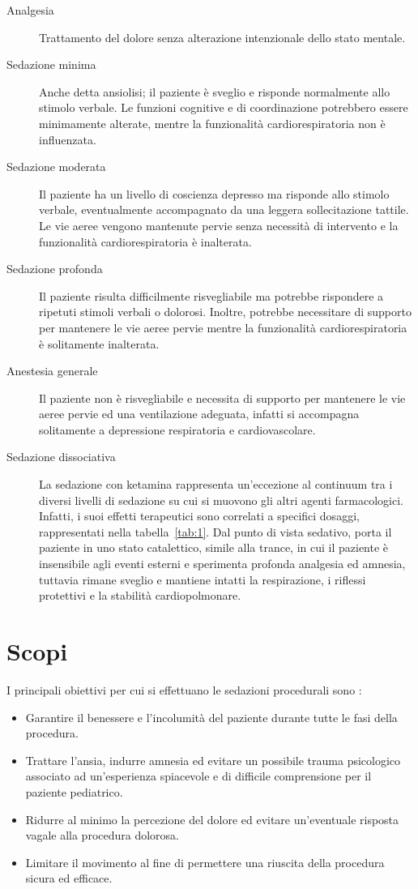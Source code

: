\begin{description}
\item[Analgesia] Trattamento del dolore senza alterazione intenzionale dello stato mentale.
\item[Sedazione minima] Anche detta ansiolisi; il paziente è sveglio e risponde normalmente allo stimolo verbale. Le funzioni cognitive e di coordinazione potrebbero essere minimamente alterate, mentre la funzionalità cardiorespiratoria non è influenzata.
\item[Sedazione moderata] Il paziente ha un livello di coscienza depresso ma risponde allo stimolo verbale, eventualmente accompagnato da una leggera sollecitazione tattile. Le vie aeree vengono mantenute pervie senza necessità di intervento e la funzionalità cardiorespiratoria è inalterata. 
\item[Sedazione profonda] Il paziente risulta difficilmente risvegliabile ma potrebbe rispondere a ripetuti stimoli verbali o dolorosi. Inoltre, potrebbe necessitare di supporto per mantenere le vie aeree pervie mentre la funzionalità cardiorespiratoria è solitamente inalterata. 
\item[Anestesia generale] Il paziente non è risvegliabile e necessita di supporto per mantenere le vie aeree pervie ed una ventilazione adeguata, infatti si accompagna solitamente a depressione respiratoria e cardiovascolare. 
\item[Sedazione dissociativa] La sedazione con ketamina rappresenta un'eccezione al continuum tra i diversi livelli di sedazione su cui si muovono gli altri agenti farmacologici. Infatti, i suoi effetti terapeutici sono correlati a specifici dosaggi, rappresentati nella tabella~\ref{tab:1}. Dal punto di vista sedativo, porta il paziente in uno stato catalettico, simile alla trance, in cui il paziente è insensibile agli eventi esterni e sperimenta profonda analgesia ed amnesia, tuttavia rimane sveglio e mantiene intatti la respirazione, i riflessi protettivi e la stabilità cardiopolmonare.

\end{description}

\section{Scopi}

I principali obiettivi per cui si effettuano le sedazioni procedurali sono \cite{Uptodatesed}: 

\begin{itemize}
    \item Garantire il benessere e l'incolumità del paziente durante tutte le fasi della procedura.
    \item Trattare l'ansia, indurre amnesia ed evitare un possibile trauma psicologico associato ad un'esperienza spiacevole e di difficile comprensione per il paziente pediatrico.
    \item Ridurre al minimo la percezione del dolore ed evitare un'eventuale risposta vagale alla procedura dolorosa.
    \item Limitare il movimento al fine di permettere una riuscita della procedura sicura ed efficace.

\end{itemize}

